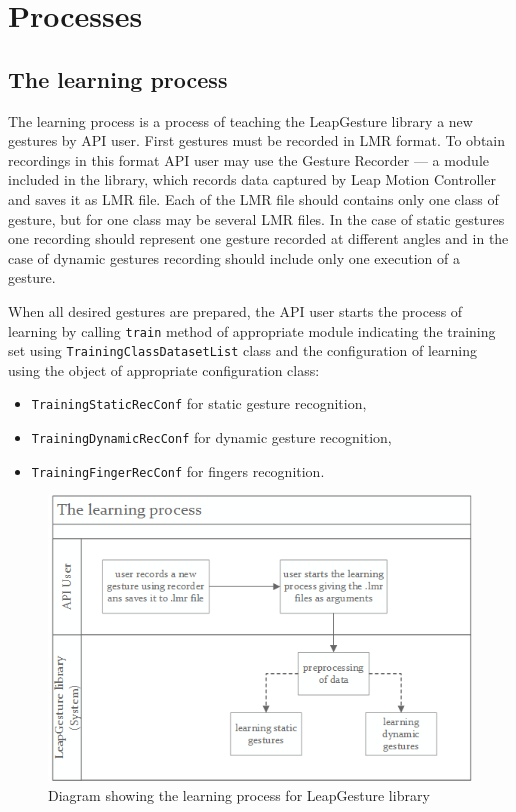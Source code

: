 \section{Processes}\label{processesSection}

\subsection{The learning process}
The learning process is a process of teaching the LeapGesture library a new gestures by API user. 
First  gestures must be recorded in LMR format. 
To obtain recordings in this format API user may use the Gesture Recorder ---  a module included in the library, which records data captured by Leap Motion Controller and saves it as LMR file. 
Each of the LMR file should contains only one class of gesture, but for one class may be several LMR files. 
In the case of static gestures one recording should represent one gesture recorded at different angles and in the case of dynamic gestures recording should include only one execution of a gesture.

When all desired gestures are prepared, the API user starts the process of learning by calling \texttt{train} method of appropriate module indicating the training set using \texttt{TrainingClassDatasetList} class and the configuration of learning using the object of appropriate configuration class:
\begin{itemize}
\item \texttt{TrainingStaticRecConf} for static gesture recognition,
\item \texttt{TrainingDynamicRecConf} for dynamic gesture recognition,
\item \texttt{TrainingFingerRecConf} for fingers recognition.
\end{itemize}


\begin{figure}[htb]
\centering
 \includegraphics[width=0.75\columnwidth]{figures/learningProcess.png}
 \caption{Diagram showing the learning process for LeapGesture library}
 \label{learningprocess}
\end{figure}

